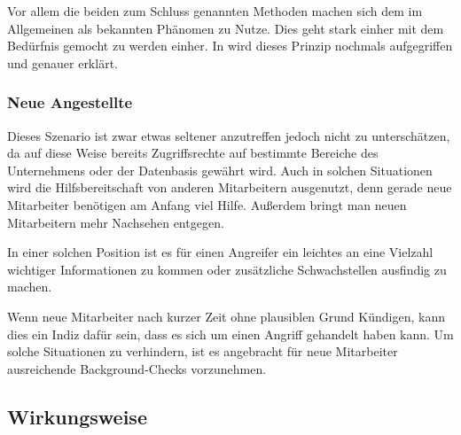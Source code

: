 Vor allem die beiden zum Schluss genannten Methoden machen sich dem im Allgemeinen als  bekannten Phänomen zu Nutze. Dies geht stark einher mit dem Bedürfnis gemocht zu werden einher. In  wird dieses Prinzip nochmals aufgegriffen und genauer erklärt.


\subsubsection*{Neue Angestellte}\label{sec:neue-angestellte}
Dieses Szenario ist zwar etwas seltener anzutreffen jedoch nicht zu unterschätzen, da auf diese
Weise bereits Zugriffsrechte auf bestimmte Bereiche des Unternehmens oder der Datenbasis gewährt wird.
Auch in solchen Situationen wird die Hilfsbereitschaft von anderen Mitarbeitern ausgenutzt, denn
gerade neue Mitarbeiter benötigen am Anfang viel Hilfe.
Außerdem bringt man neuen Mitarbeitern mehr Nachsehen entgegen.

In einer solchen Position ist es für einen Angreifer ein leichtes an eine Vielzahl wichtiger
Informationen zu kommen oder zusätzliche Schwachstellen ausfindig zu machen.

Wenn neue Mitarbeiter nach kurzer Zeit ohne plausiblen Grund Kündigen, kann dies ein Indiz dafür sein,
dass es sich um einen Angriff gehandelt haben kann.
Um solche Situationen zu verhindern, ist es angebracht für neue Mitarbeiter ausreichende Background-Checks vorzunehmen. \cite{hacking-the-human}

\subsection{Wirkungsweise}\label{sec:wirkungsweise}
